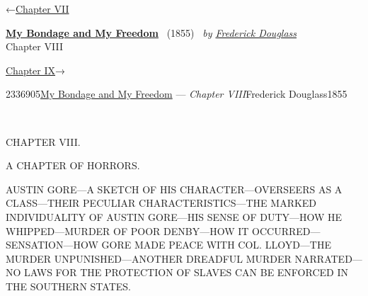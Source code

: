 \hypertarget{headerContainer}{}
\hypertarget{navigationHeader}{}
\protect\hypertarget{headerprevious}{}{←\href{/wiki/My_Bondage_and_My_Freedom_(1855)/Chapter_VII}{Chapter
VII}}

\textbf{\protect\hypertarget{header_title_text}{}{\href{/wiki/My_Bondage_and_My_Freedom_(1855)}{My
Bondage and My Freedom}}} ~(1855)~ \emph{by
\href{/wiki/Author:Frederick_Douglass}{\protect\hypertarget{header_author_text}{}{{Frederick
Douglass}}}}\\
\protect\hypertarget{header_section_text}{}{Chapter VIII}

\protect\hypertarget{headernext}{}{\href{/wiki/My_Bondage_and_My_Freedom_(1855)/Chapter_IX}{Chapter
IX}→}

\hypertarget{navigationNotes}{}

\hypertarget{ws-data}{}
\protect\hypertarget{ws-article-id}{}{2336905}\protect\hypertarget{ws-title}{}{\href{/wiki/My_Bondage_and_My_Freedom_(1855)}{My
Bondage and My Freedom} --- \emph{Chapter
VIII}}\protect\hypertarget{ws-author}{}{Frederick
Douglass}\protect\hypertarget{ws-year}{}{1855}

{\protect\hypertarget{119}{}{}}

~

{CHAPTER VIII.}

A CHAPTER OF HORRORS.

{AUSTIN GORE---A SKETCH OF HIS CHARACTER---OVERSEERS AS A CLASS---THEIR
PECULIAR CHARACTERISTICS---THE MARKED INDIVIDUALITY OF AUSTIN GORE---HIS
SENSE OF DUTY---HOW HE WHIPPED---MURDER OF POOR DENBY---HOW IT
OCCURRED---SENSATION---HOW GORE MADE PEACE WITH COL. LLOYD---THE MURDER
UNPUNISHED---ANOTHER DREADFUL MURDER NARRATED---NO LAWS FOR THE
PROTECTION OF SLAVES CAN BE ENFORCED IN THE SOUTHERN STATES.}

